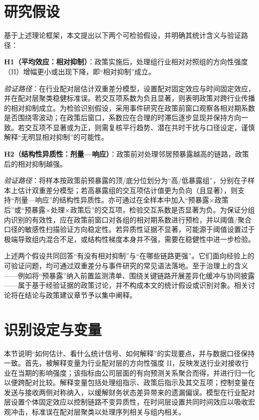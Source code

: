 \section{研究假设}
基于上述理论框架，本文提出以下两个可检验假设，并明确其统计含义与验证路径：

\noindent\textbf{H1（平均效应：相对抑制）}：政策实施后，处理组行业相对对照组的方向性强度（II）增幅更小或出现下降，即“相对抑制”成立。

\noindent\textit{验证路径}：在行业配对层估计双重差分模型，设置配对固定效应与时间固定效应，并在配对层聚类稳健标准误。若交互项系数为负且显著，则表明政策对跨行业传播的相对抑制成立。为检验识别假设，采用事件研究在政策前窗口观察各相对期系数是否围绕零波动；在政策后窗口，系数应在合理的时滞后逐步显现并保持方向一致。若交互项不显著或为正，则需复核平行趋势、潜在共时干扰与口径设定，谨慎解释“无明显相对抑制”的可能性。

\noindent\textbf{H2（结构性异质性：剂量—响应）}：政策前对处理邻居预暴露越高的链路，政策后的相对抑制越强。

\noindent\textit{验证路径}：将样本按政策前预暴露的顶/底分位划分为“高/低暴露组”，分别在子样本上估计双重差分模型；若高暴露组的交互项估计值更为负向（且显著），则支持“剂量—响应”的结构性异质性。亦可通过在全样本中加入“预暴露×政策后”或“预暴露×处理×政策后”的交互项，检验交互系数是否显著为负。为保证分组内识别的有效性，应在政策前窗口对各组的相对期系数进行预检，并以阈值/聚合口径的敏感性扫描验证方向稳定性。若异质性证据不显著，可能源于阈值设置过于极端导致组内混合不足，或结构性梯度本身并不强，需要在稳健性中进一步检验。

上述两个假设共同回答“有没有相对抑制”与“在哪些链路更强”。它们面向经验上的可验证问题，均可通过双重差分与事件研究的常见语法落地。至于治理上的含义——例如将“预暴露”纳入前置监测清单、围绕关键链路开展差异化缓冲与协同披露——属于基于经验证据的政策讨论，并不构成本文的统计假设或识别对象。相关讨论将在结论与政策建议章节予以集中阐释。

\section{识别设定与变量}
本节说明“如何估计、看什么统计信号、如何解释”的实现要点，并与数据口径保持一致。首先，被解释变量为行业配对层的方向性强度 II，反映发送行业对接收行业在当期的影响强度；该指标由公司层面的有向预测关系聚合而得，并进行归一化以便跨配对比较。解释变量包括处理组指示、政策后指示及其交互项；控制变量在发送与接收两侧对称纳入，以缓解财务状态差异带来的遗漏偏误。模型在行业配对层设置个体固定效应以控制链路不变异质性，在时间层设置共同时间效应以吸收宏观冲击，标准误在配对层聚类以处理序列相关与组内相关。

